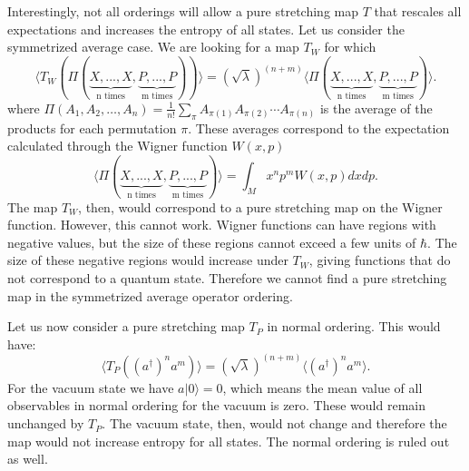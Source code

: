 \documentclass{article}
\begin{document}
Interestingly, not all orderings will allow a pure stretching map $T$ that rescales all expectations and increases the entropy of all states. Let us consider the symmetrized average case. We are looking for a map $T_W$ for which
\begin{equation}
\langle T_W(\Pi(\underbrace{X, ..., X}_{\text{n times}}, \underbrace{P, ..., P}_{\text{m times}})) \rangle = (\sqrt{\lambda})^{(n+m)} \langle \Pi(\underbrace{X, ..., X}_{\text{n times}}, \underbrace{P, ..., P}_{\text{m times}})\rangle.
\end{equation}
where $\Pi(A_1, A_2, \ldots, A_n)  = \frac{1}{n!} \sum_{\pi}  A_{\pi(1)} A_{\pi(2)} \cdots A_{\pi(n)}$ is the average of the products for each permutation $\pi$. These averages correspond to the expectation calculated through the Wigner function $W(x,p)$
\begin{equation}
     \langle \Pi(\underbrace{X, ..., X}_{\text{n times}}, \underbrace{P, ..., P}_{\text{m times}})\rangle = \int_M x^n p^m W(x, p) dx dp.
\end{equation}
The map $T_W$, then, would correspond to a pure stretching map on the Wigner function. However, this cannot work. Wigner functions can have regions with negative values, but the size of these regions cannot exceed a few units of $\hbar$.\cite{kenfack2004negativity} The size of these negative regions would increase under $T_W$, giving functions that do not correspond to a quantum state. Therefore we cannot find a pure stretching map in the symmetrized average operator ordering.

Let us now consider a pure stretching map $T_P$ in normal ordering. This would have:
\begin{equation}
\langle T_P((a^\dagger)^n a^m) \rangle = (\sqrt{\lambda})^{(n+m)} \langle (a^\dagger)^n a^m \rangle.
\end{equation}
For the vacuum state we have $a|0\rangle=0$, which means the mean value of all observables in normal ordering for the vacuum is zero. These would remain unchanged by $T_P$. The vacuum state, then, would not change and therefore the map would not increase entropy for all states. The normal ordering is ruled out as well.
\end{document}
